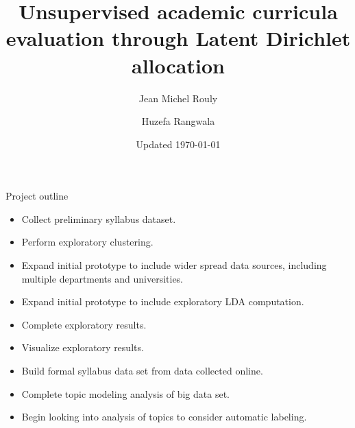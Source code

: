 \documentclass{beamer}
\title[Curricula and LDA]{Unsupervised academic curricula evaluation
  through Latent Dirichlet allocation}
\author{Jean Michel Rouly \and Huzefa Rangwala}
\date{Updated \today}
\begin{document}
  \frame{\titlepage}

  

  

  

  

  \begin{frame}{Project outline}
    \begin{itemize}
      \item { Collect preliminary syllabus dataset.}
      \item {\color<2>{green} Perform exploratory clustering.}
      \item { Expand initial prototype to include wider
      spread data sources, including multiple departments and
      universities.}
      \item { Expand initial prototype to include exploratory
      LDA computation.}
      \item {\color<2>{green}Complete exploratory results.}
      \item {Visualize exploratory results}.
      \item {Build formal syllabus data set from data
      collected online.}
      \item Complete topic modeling analysis of big data set.
      \item Begin looking into analysis of topics to consider automatic
      labeling.
    \end{itemize}
  \end{frame}

  

  

  
\end{document}
